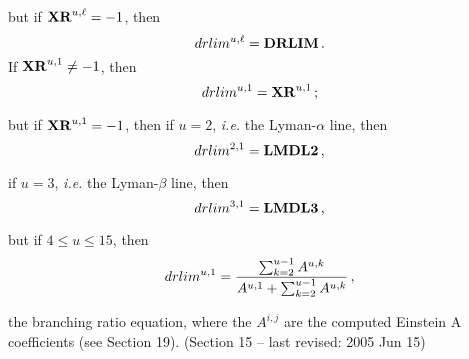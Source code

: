 but if ${\bf XR}^{u,\ell} = -1$, then
$$ drlim^{u,\ell} = {\bf DRLIM} \, . $$
\blankline
{}
\blankline
If ${\bf XR}^{u,1} \ne -1$, then
$$ drlim^{u,1} = {\bf XR}^{u,1} \, ; $$

but if ${\bf XR}^{u,1} = -1$, then
\blankline
if $u = 2$, {\it i.e.} the Lyman-$\alpha$ line, then
$$ drlim^{2,1} = {\bf LMDL2} \, , $$

if $u = 3$, {\it i.e.} the Lyman-$\beta$ line, then
$$ drlim^{3,1} = {\bf LMDL3} \, , $$

but if $4 \leq u \leq 15$, then
$$ drlim^{u,1} = { \sum_{k=2}^{u-1} A^{u,k}
                   \over 
                   { A^{u,1} + \sum_{k=2}^{u-1} A^{u,k} } } \, , $$

\noindent the branching ratio equation,
where the $A^{i,j}$ are the computed Einstein A coefficients
(see Section 19).
\vfill
\noindent (Section 15 -- last revised: 2005 Jun 15) \par
{}
\ej
